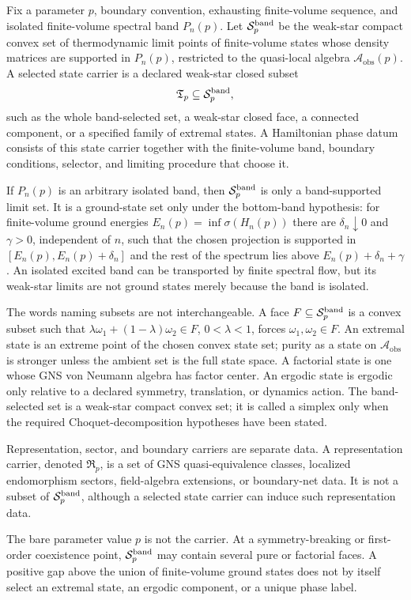\begin{definition}
\label{def:hamiltonian-phase-carrier}
Fix a parameter \(p\), boundary convention, exhausting finite-volume sequence,
and isolated finite-volume spectral band \(P_n(p)\).  Let
\(\mathcal S_p^{\rm band}\) be the weak-star compact convex set of
thermodynamic limit points of finite-volume states whose density matrices are
supported in \(P_n(p)\), restricted to the quasi-local algebra
\(\mathcal A_{\mathrm{obs}}(p)\).  A selected state carrier is a declared
weak-star closed subset
\[
  \mathfrak T_p\subseteq\mathcal S_p^{\rm band},
\]
such as the whole band-selected set, a weak-star closed face, a connected
component, or a specified family of extremal states.  A Hamiltonian phase datum
consists of this state carrier together with the finite-volume band, boundary
conditions, selector, and limiting procedure that choose it.

If \(P_n(p)\) is an arbitrary isolated band, then
\(\mathcal S_p^{\rm band}\) is only a band-supported limit set.  It is a
ground-state set only under the bottom-band hypothesis: for finite-volume
ground energies \(E_n(p)=\inf\sigma(H_n(p))\) there are
\(\delta_n\downarrow0\) and \(\gamma>0\), independent of \(n\), such that the
chosen projection is supported in
\([E_n(p),E_n(p)+\delta_n]\) and the rest of the spectrum lies above
\(E_n(p)+\delta_n+\gamma\).  An isolated excited band can be transported by
finite spectral flow, but its weak-star limits are not ground states merely
because the band is isolated.

The words naming subsets are not interchangeable.  A face
\(F\subseteq\mathcal S_p^{\rm band}\) is a convex subset such that
\(\lambda\omega_1+(1-\lambda)\omega_2\in F\), \(0<\lambda<1\), forces
\(\omega_1,\omega_2\in F\).  An extremal state is an extreme point of the
chosen convex state set; purity as a state on \(\mathcal A_{\mathrm{obs}}\) is
stronger unless the ambient set is the full state space.  A factorial state is
one whose GNS von Neumann algebra has factor center.  An ergodic state is
ergodic only relative to a declared symmetry, translation, or dynamics action.
The band-selected set is a weak-star compact convex set; it is called a
simplex only when the required Choquet-decomposition hypotheses have been
stated.

Representation, sector, and boundary carriers are separate data.  A
representation carrier, denoted \(\mathfrak R_p\), is a set of GNS
quasi-equivalence classes, localized endomorphism sectors, field-algebra
extensions, or boundary-net data.  It is not a subset of
\(\mathcal S_p^{\rm band}\), although a selected state carrier can induce such
representation data.

The bare parameter value \(p\) is not the carrier.  At a symmetry-breaking or
first-order coexistence point, \(\mathcal S_p^{\rm band}\) may contain several
pure or factorial faces.  A positive gap above the union of finite-volume
ground states does not by itself select an extremal state, an ergodic
component, or a unique phase label.
\end{definition}

